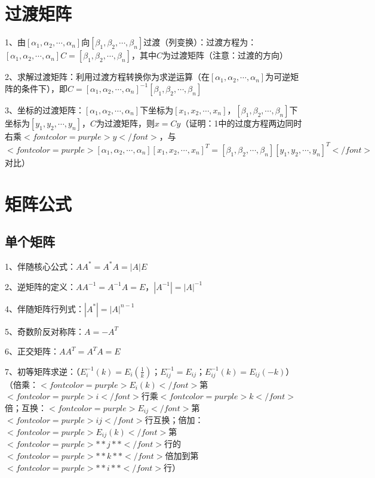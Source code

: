 \section{过渡矩阵}

1、由$ [\alpha_1,\alpha_2,\cdots,\alpha_n] $向$ [\beta_1,\beta_2,\cdots,\beta_n] $过渡（列变换）：过渡方程为：$ [\alpha_1,\alpha_2,\cdots,\alpha_n]C=[\beta_1,\beta_2,\cdots,\beta_n] $，其中$ C $为过渡矩阵（注意：过渡的方向）

2、求解过渡矩阵：利用过渡方程转换你为求逆运算（在$ [\alpha_1,\alpha_2,\cdots,\alpha_n] $为可逆矩阵的条件下），即$ C=[\alpha_1,\alpha_2,\cdots,\alpha_n]^{-1}[\beta_1,\beta_2,\cdots,\beta_n] $

3、坐标的过渡矩阵：$ [\alpha_1,\alpha_2,\cdots,\alpha_n] $下坐标为$ [x_1,x_2,\cdots,x_n] $，$ [\beta_1,\beta_2,\cdots,\beta_n] $下坐标为$ [y_1,y_2,\cdots,y_n] $，$ C $为过渡矩阵，则$ x=Cy $（证明：1中的过度方程两边同时右乘$ <font color=purple>y</font> $，与$ <font color=purple>[\alpha_1,\alpha_2,\cdots,\alpha_n][x_1,x_2,\cdots,x_n]^T=[\beta_1,\beta_2,\cdots,\beta_n][y_1,y_2,\cdots,y_n]^T</font> $对比）

\section{矩阵公式}



\subsection{单个矩阵}

1、伴随核心公式：$ AA^*=A^*A=|A|E $

2、逆矩阵的定义：$ AA^{-1}=A^{-1}A=E $，$ |A^{-1}|=|A|^{-1} $

4、伴随矩阵行列式：$ |A^*|=|A|^{n-1} $

5、奇数阶反对称阵：$ A=-A^T $

6、正交矩阵：$ AA^T=A^TA=E $

7、初等矩阵求逆：（$ E_{i}^{-1}(k)=E_{i}(\frac 1 k) $；$ E_{ij}^{-1}=E_{ij} $；$ E_{ij}^{-1}(k)=E_{ij}(-k) $）（倍乘：$ <font color=purple>E_{i}(k)</font> $第$ <font color=purple>i</font> $行乘$ <font color=purple>k</font> $倍；互换：$ <font color=purple>E_{ij}</font> $第$ <font color=purple>ij</font> $行互换；倍加：$ <font color=purple>E_{ij}(k)</font> $第$ <font color=purple>**j**</font> $行的$ <font color=purple>**k**</font> $倍加到第$ <font color=purple>**i**</font> $行）



